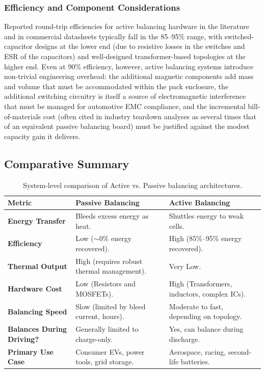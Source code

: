 \subsubsection{Efficiency and Component Considerations}
\label{subsubsec:14_active_efficiency}

Reported round-trip efficiencies for active balancing hardware in the literature and in commercial datasheets typically fall in the 85–95\% range, with switched-capacitor designs at the lower end (due to resistive losses in the switches and ESR of the capacitors) and well-designed transformer-based topologies at the higher end. Even at 90\% efficiency, however, active balancing systems introduce non-trivial engineering overhead: the additional magnetic components add mass and volume that must be accommodated within the pack enclosure, the additional switching circuitry is itself a source of electromagnetic interference that must be managed for automotive EMC compliance, and the incremental bill-of-materials cost (often cited in industry teardown analyses as several times that of an equivalent passive balancing board) must be justified against the modest capacity gain it delivers.

\subsection{Comparative Summary}
\label{subsec:14_comparison_table}

\begin{table}[htbp]
\centering
\caption{System-level comparison of Active vs. Passive balancing architectures.}
\label{tab:14_balancing_comparison}
\renewcommand{\arraystretch}{1.4}
\begin{tabularx}{\textwidth}{@{}l X X@{}}
\toprule
\textbf{Metric} & \textbf{Passive Balancing} & \textbf{Active Balancing} \\
\midrule
\textbf{Energy Transfer} & Bleeds excess energy as heat. & Shuttles energy to weak cells. \\
\textbf{Efficiency} & Low ($\sim$0\% energy recovered). & High (85\%--95\% energy recovered). \\
\textbf{Thermal Output} & High (requires robust thermal management). & Very Low. \\
\textbf{Hardware Cost} & Low (Resistors and MOSFETs). & High (Transformers, inductors, complex ICs). \\
\textbf{Balancing Speed} & Slow (limited by bleed current, hours). & Moderate to fast, depending on topology. \\
\textbf{Balances During Driving?} & Generally limited to charge-only. & Yes, can balance during discharge. \\
\textbf{Primary Use Case} & Consumer EVs, power tools, grid storage. & Aerospace, racing, second-life batteries. \\
\bottomrule
\end{tabularx}
\end{table}

